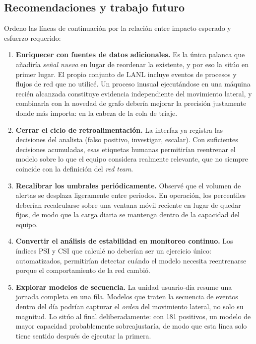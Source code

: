 \documentclass[12pt, a4paper]{article}
\begin{document}
\subsection{Recomendaciones y trabajo futuro}

Ordeno las líneas de continuación por la relación entre impacto esperado y esfuerzo requerido:

\begin{enumerate}[leftmargin=1.5cm]
  \item \textbf{Enriquecer con fuentes de datos adicionales.} Es la única palanca que añadiría
        \textit{señal nueva} en lugar de reordenar la existente, y por eso la sitúo en primer lugar.
        El propio conjunto de LANL incluye eventos de procesos y flujos de red que no utilicé. Un
        proceso inusual ejecutándose en una máquina recién alcanzada constituye evidencia
        independiente del movimiento lateral, y combinarla con la novedad de grafo debería mejorar la
        precisión justamente donde más importa: en la cabeza de la cola de triaje.
  \item \textbf{Cerrar el ciclo de retroalimentación.} La interfaz ya registra las decisiones del
        analista (falso positivo, investigar, escalar). Con suficientes decisiones acumuladas, esas
        etiquetas humanas permitirían reentrenar el modelo sobre lo que el equipo considera realmente
        relevante, que no siempre coincide con la definición del \textit{red team}.
  \item \textbf{Recalibrar los umbrales periódicamente.} Observé que el volumen de alertas se
        desplaza ligeramente entre periodos. En operación, los percentiles deberían recalcularse
        sobre una ventana móvil reciente en lugar de quedar fijos, de modo que la carga diaria se
        mantenga dentro de la capacidad del equipo.
  \item \textbf{Convertir el análisis de estabilidad en monitoreo continuo.} Los índices PSI y CSI
        que calculé no deberían ser un ejercicio único: automatizados, permitirían detectar cuándo el
        modelo necesita reentrenarse porque el comportamiento de la red cambió.
  \item \textbf{Explorar modelos de secuencia.} La unidad usuario-día resume una jornada completa en
        una fila. Modelos que traten la secuencia de eventos dentro del día podrían capturar el
        \textit{orden} del movimiento lateral, no solo su magnitud. Lo sitúo al final
        deliberadamente: con 181 positivos, un modelo de mayor capacidad probablemente sobreajustaría,
        de modo que esta línea solo tiene sentido después de ejecutar la primera.
\end{enumerate}
\end{document}
